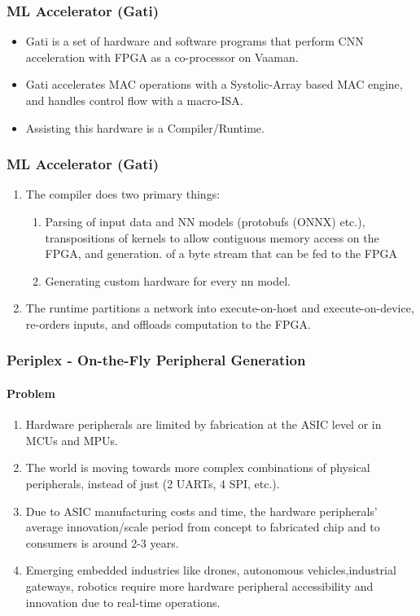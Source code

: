 \documentclass{beamer}
\begin{document}
{\begin{frame}[fragile]
\end{frame}

\begin{frame}[fragile]
  \frametitle{ML Accelerator (Gati)}
  \begin{itemize}
    \item Gati is a set of hardware and software programs that perform CNN
  acceleration with FPGA as a co-processor on Vaaman.
\item Gati accelerates MAC operations with a Systolic-Array based MAC engine,
  and handles control flow with a macro-ISA.
    \item Assisting this hardware is a Compiler/Runtime.
  \end{itemize}
\end{frame}

\begin{frame}[fragile]
  \frametitle{ML Accelerator (Gati)}
  \begin{enumerate}
    \item The compiler does two primary things:
      \begin{enumerate}
        \item Parsing of input data and NN models (protobufs (ONNX) etc.),
          transpositions of kernels to allow contiguous memory access on the 
          FPGA, and generation.
          of a byte stream that can be fed to the FPGA
        \item Generating custom hardware for every nn model.
      \end{enumerate}
    \item The runtime partitions a network into execute-on-host and
      execute-on-device, re-orders inputs, and offloads computation
      to the FPGA.
  \end{enumerate}
\end{frame}

\begin{frame}[fragile]
  \frametitle{Periplex - On-the-Fly Peripheral Generation}
  \framesubtitle{Problem}
  \begin{enumerate}
    \item Hardware peripherals are limited by fabrication at the ASIC level or
      in MCUs and MPUs.
    \item The world is moving towards more complex combinations of physical
      peripherals, instead of just (2 UARTs, 4 SPI, etc.).
    \item Due to ASIC manufacturing costs and time, the hardware peripherals’
      average innovation/scale period from concept to fabricated chip and to
      consumers is around 2-3 years.
    \item Emerging embedded industries like drones, autonomous
  vehicles,industrial gateways, robotics require more hardware peripheral
  accessibility and innovation due to real-time operations.
  \end{enumerate}
\end{frame}


}
\end{document}
